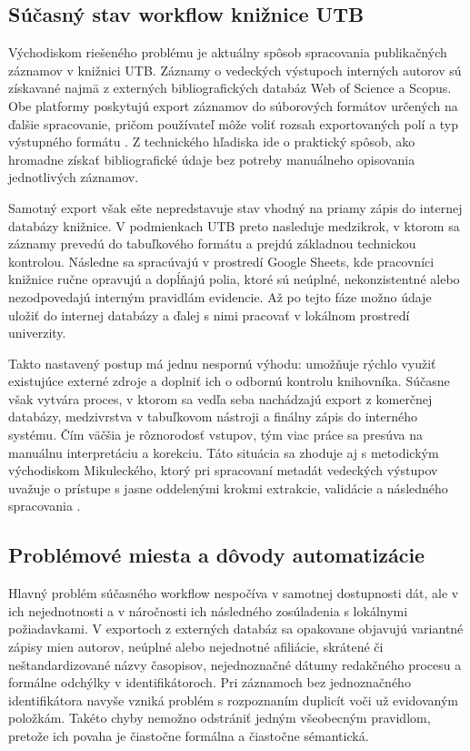 \subsection{Súčasný stav workflow knižnice UTB}

Východiskom riešeného problému je aktuálny spôsob spracovania publikačných záznamov v knižnici UTB. Záznamy o vedeckých výstupoch interných autorov sú získavané najmä z externých bibliografických databáz Web of Science a Scopus. Obe platformy poskytujú export záznamov do súborových formátov určených na ďalšie spracovanie, pričom používateľ môže voliť rozsah exportovaných polí a typ výstupného formátu \cite{ClarivateWOSExport,ScopusSupport}. Z technického hľadiska ide o praktický spôsob, ako hromadne získať bibliografické údaje bez potreby manuálneho opisovania jednotlivých záznamov.

Samotný export však ešte nepredstavuje stav vhodný na priamy zápis do internej databázy knižnice. V podmienkach UTB preto nasleduje medzikrok, v ktorom sa záznamy prevedú do tabuľkového formátu a prejdú základnou technickou kontrolou. Následne sa spracúvajú v prostredí Google Sheets, kde pracovníci knižnice ručne opravujú a dopĺňajú polia, ktoré sú neúplné, nekonzistentné alebo nezodpovedajú interným pravidlám evidencie. Až po tejto fáze možno údaje uložiť do internej databázy a ďalej s nimi pracovať v lokálnom prostredí univerzity.

Takto nastavený postup má jednu nespornú výhodu: umožňuje rýchlo využiť existujúce externé zdroje a doplniť ich o odbornú kontrolu knihovníka. Súčasne však vytvára proces, v ktorom sa vedľa seba nachádzajú export z komerčnej databázy, medzivrstva v tabuľkovom nástroji a finálny zápis do interného systému. Čím väčšia je rôznorodosť vstupov, tým viac práce sa presúva na manuálnu interpretáciu a korekciu. Táto situácia sa zhoduje aj s metodickým východiskom Mikuleckého, ktorý pri spracovaní metadát vedeckých výstupov uvažuje o prístupe s jasne oddelenými krokmi extrakcie, validácie a následného spracovania \cite{Mikulecky2025}.

\subsection{Problémové miesta a dôvody automatizácie}

Hlavný problém súčasného workflow nespočíva v samotnej dostupnosti dát, ale v ich nejednotnosti a v náročnosti ich následného zosúladenia s lokálnymi požiadavkami. V exportoch z externých databáz sa opakovane objavujú variantné zápisy mien autorov, neúplné alebo nejednotné afiliácie, skrátené či neštandardizované názvy časopisov, nejednoznačné dátumy redakčného procesu a formálne odchýlky v identifikátoroch. Pri záznamoch bez jednoznačného identifikátora navyše vzniká problém s rozpoznaním duplicít voči už evidovaným položkám. Takéto chyby nemožno odstrániť jedným všeobecným pravidlom, pretože ich povaha je čiastočne formálna a čiastočne sémantická.

